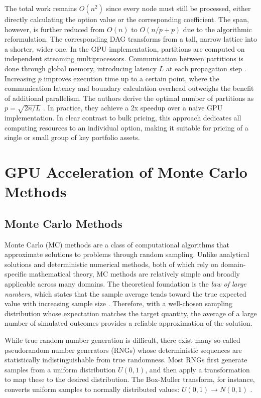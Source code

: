 \documentclass[english,12pt,a4paper,pdftex,sci,utf8]{aaltothesis}
\begin{document}
The total work remains $O(n^2)$ since every node must still be processed, either directly calculating the option value or the corresponding coefficient. The span, however, is further reduced from $O(n)$ to $O(n/p + p)$ due to the algorithmic reformulation. The corresponding DAG transforms from a tall, narrow lattice into a shorter, wider one. In the GPU implementation, partitions are computed on independent streaming multiprocessors. Communication between partitions is done through global memory, introducing latency $L$ at each propagation step \cite{ganesan2009acceleration}. Increasing $p$ improves execution time up to a certain point, where the communication latency and boundary calculation overhead outweighs the benefit of additional parallelism. The authors derive the optimal number of partitions as $p = \sqrt{2n/L}$ \cite{ganesan2009acceleration}. In practice, they achieve a 2x speedup over a naive GPU implementation. In clear contrast to bulk pricing, this approach dedicates all computing resources to an individual option, making it suitable for pricing of a single or small group of key portfolio assets.

\section{GPU Acceleration of Monte Carlo Methods} \label{sec:gpu-mc}
\subsection{Monte Carlo Methods}
Monte Carlo (MC) methods are a class of computational algorithms that approximate solutions to problems through random sampling. Unlike analytical solutions and deterministic numerical methods, both of which rely on domain-specific mathematical theory, MC methods are relatively simple and broadly applicable across many domains. The theoretical foundation is the \emph{law of large numbers}, which states that the sample average tends toward the true expected value with increasing sample size \cite{Ross2020prob}. Therefore, with a well-chosen sampling distribution whose expectation matches the target quantity, the average of a large number of simulated outcomes provides a reliable approximation of the solution.

While true random number generation is difficult, there exist many so-called pseudorandom number generators (RNGs) whose deterministic sequences are statistically indistinguishable from true randomness. Most RNGs first generate samples from a uniform distribution $U(0,1)$, and then apply a transformation to map these to the desired distribution. The Box-Muller transform, for instance, converts uniform samples to normally distributed values: $U(0,1) \rightarrow N(0,1)$ \cite{gentle2003random}.
\end{document}
